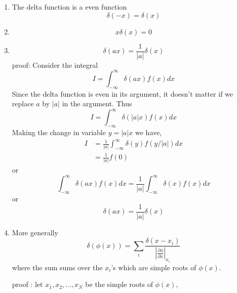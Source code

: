 		\begin{enumerate}[label=\textbf{Property \ \arabic*},start=1]
			\item 
			The delta function is a even function
			\begin{equation}
				\delta(-x) = \delta(x)
			\end{equation}
			
			\item
			\begin{equation}
				x \delta(x) = 0
			\end{equation}
			
			\item
			\begin{equation}
			\delta(a x) = \frac{1}{|a|} \delta(x)
			\end{equation}
			proof: Consider the integral
			\begin{equation}
				I = \int_{-\infty}^{\infty} \delta(a x) f(x) dx
			\end{equation}
			Since the delta function is even in its argument, it doesn't matter if we replace $a$ by $|a|$ in the argument. Thus
			\begin{equation}
				I = \int_{-\infty}^{\infty} \delta(|a| x) f(x) dx
			\end{equation}
			Making the change in variable $ y = |a| x$ we have,
			\begin{eqnarray}
				I &= \frac{1}{|a|}\int_{-\infty}^{\infty} \delta(y) f(y/|a|) dx \nonumber \\
				&= \frac{1}{|a|} f(0) \nonumber
			\end{eqnarray}			
			or
			\begin{equation}
				\int_{-\infty}^{\infty} \delta(a x) f(x) dx = \frac{1}{|a|} \int_{-\infty}^{\infty} \delta(x) f(x) dx
			\end{equation}
			or
			\begin{equation}
				\delta(a x) = \frac{1}{|a|} \delta(x)
			\end{equation}
			
			
			\item
			More generally
			\begin{equation}
				\delta(\phi(x)) = \sum_{i} \frac{\delta(x - x_i)}{\left|\frac{\partial\phi}{\partial x}\right|_{x_i}}
			\end{equation}
			where the sum sums over the $x_i$'s which are simple roots of $\phi(x)$.
			
			proof : let $x_1 , x_2, \ldots , x_N$ be the simple roots of $\phi(x)$,
			

\end{enumerate}
